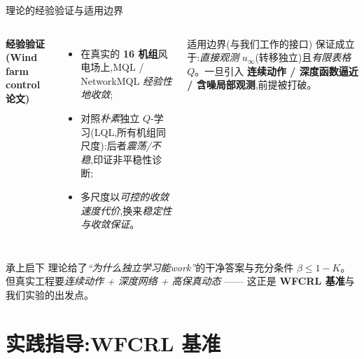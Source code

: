 \documentclass[aspectratio=169,11pt,UTF8]{ctexbeamer}
\newcommand{\wind}{u_{\infty}}
\newcommand{\emphb}[1]{\textcolor{myred}{\textbf{#1}}}
\newcommand{\emphg}[1]{\textcolor{mygreen}{\textbf{#1}}}
\begin{document}
\begin{frame}{理论的经验验证与适用边界}
\small
\begin{columns}[T]
\textbf{经验验证(Wind farm control 论文)}
\begin{itemize}\setlength\itemsep{2pt}
  \item 在真实的 \textbf{16 机组}风电场上,MQL / NetworkMQL \emph{经验性地收敛};
  \item 对照\emph{朴素}独立 $Q$-学习(LQL,所有机组同尺度):后者\emph{震荡/不稳},印证非平稳性诊断;
  \item 多尺度以\emph{可控的收敛速度代价},换来\emph{稳定性与收敛保证}。
\end{itemize}
\begin{alertblock}{适用边界(与我们工作的接口)}
保证成立于:\emph{直接观测} $\wind$(转移独立)且\emph{有限表格} $Q$。一旦引入
\emphb{连续动作 / 深度函数逼近 / 含噪局部观测},前提被打破。
\end{alertblock}
\end{columns}
\vspace{1mm}
\begin{block}{承上启下}
\centering
理论给了\emph{“为什么独立学习能work”}的干净答案与充分条件 $\beta\le1-K$。\\
但真实工程要\emph{连续动作 + 深度网络 + 高保真动态} —— 这正是 \emphg{WFCRL 基准}与我们实验的出发点。
\end{block}
\end{frame}

\section{实践指导:WFCRL 基准}
\end{document}
